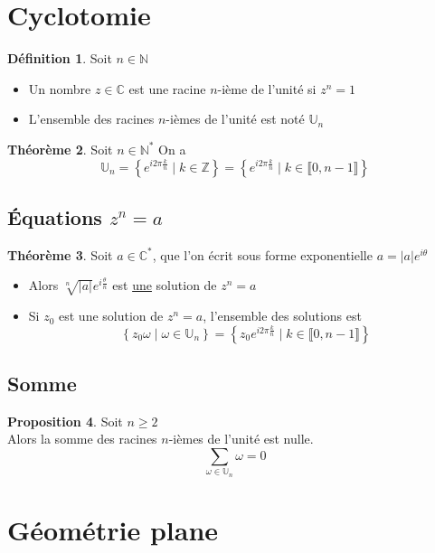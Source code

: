 \documentclass[10pt,a4paper]{article}
\theoremstyle{definition}
\newtheorem{proposition}{Proposition}[section]
\newtheorem{theorem}[proposition]{Théorème}
\newtheorem{definition}[proposition]{Définition}
\begin{document}
\section{Cyclotomie}
\begin{definition}
Soit $n \in \mathbb{N}$
\begin{itemize}
\item Un nombre $z \in \mathbb{C}$ est une racine $n$-ième de l'unité si $z^n = 1$
\item L'ensemble des racines $n$-ièmes de l'unité est noté $\mathbb{U}_n$
\end{itemize}
\end{definition}
\begin{theorem}
Soit $n \in \mathbb{N}^*$
On a
\[ \mathbb{U}_n = \left\{ e^{i2\pi\frac{k}{n}} \mid k \in \mathbb{Z}\right\} = \left\{ e^{i2\pi\frac{k}{n}} \mid k \in \llbracket 0, n - 1 \rrbracket \right\} \]
\end{theorem}

\subsection{Équations $z^n = a$}
\begin{theorem}
Soit $a \in \mathbb{C}^*$, que l'on écrit sous forme exponentielle $a = |a|e^{i\theta}$
\begin{itemize}
\item Alors $\sqrt[n]{|a|}e^{i\frac{\theta}{n}}$ est \uline{une} solution de $z^n = a$
\item Si $z_0$ est une solution de $z^n = a$, l'ensemble des solutions est
\[ \left\{ z_0 \omega \mid \omega \in \mathbb{U}_n \right\} = \left\{ z_0 e^{i2\pi\frac{k}{n}} \mid k \in \llbracket 0, n - 1 \rrbracket \right\} \]
\end{itemize}
\end{theorem}

\subsection{Somme}
\begin{proposition}
Soit $n \geq 2$ \\
Alors la somme des racines $n$-ièmes de l'unité est nulle.
\[ \sum_{\omega \in \mathbb{U}_n} \omega = 0 \]
\end{proposition}

\section{Géométrie plane}
\end{document}
